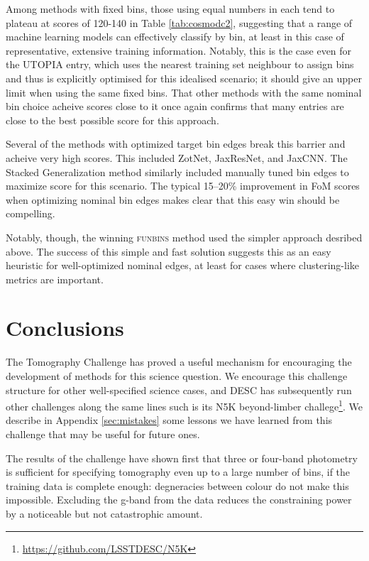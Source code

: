 \documentclass[twocolumn,twocolappendix]{aastex63}
\begin{document}
Among methods with fixed bins, those using equal numbers in each tend to plateau at scores of
120-140 in Table \ref{tab:cosmodc2}, suggesting that a range of machine learning models can
effectively classify by bin, at least in this case of representative, extensive training
information.  Notably, this is the case even for the \textsc{UTOPIA} entry, which uses the nearest 
training set neighbour to assign bins and thus is explicitly optimised
for this idealised scenario; it should give an upper limit when using the same fixed bins.
That other methods with the same nominal bin choice acheive scores close to it once again
confirms that many entries are close to the best possible score for this approach.


Several of the methods with optimized target bin edges break this
barrier and acheive very high scores.  This included ZotNet, JaxResNet, and JaxCNN.  The
Stacked Generalization method similarly included manually tuned bin edges to maximize
score for this scenario. The typical 15--20\% improvement in FoM scores when optimizing
nominal bin edges makes clear that this easy win should be compelling.

Notably, though, the winning \textsc{funbins} method used the simpler approach desribed above. The success of this simple and fast solution suggests this as an easy heuristic for well-optimized nominal edges, at least
for cases where clustering-like metrics are important.

\section{Conclusions} \label{sec:conclusion}
The Tomography Challenge has proved a useful mechanism for encouraging the development
of methods for this science question.  We encourage this challenge structure for other
well-specified science cases, and DESC has subsequently run other challenges along the same lines
such is its N5K beyond-limber challege\footnote{\url{https://github.com/LSSTDESC/N5K}}.
We describe in Appendix \ref{sec:mistakes} some lessons we have learned from this challenge
that may be useful for future ones.

The results of the challenge have shown first that three or four-band photometry
is sufficient for specifying tomography even up to a large number of bins, if
the training data is complete enough: degneracies between colour do not make this impossible.
Excluding the g-band from the data reduces the constraining power by a noticeable but
not catastrophic amount.
\end{document}
